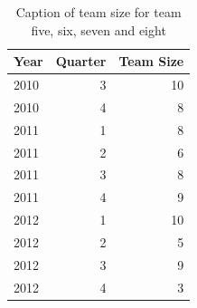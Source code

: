\documentclass[UKenglish]{ifimaster}  %
\begin{document}
\begin{table}[!htbp]
\begin{adjustwidth}{-0cm}{}
{{\begin{tabular}{ | l | r | r | }
\hline
	 Year & Quarter & Team Size \\ \hline
	2010 & 3 & 10  \\ \hline
	2010 & 4 & 8   \\ \hline
	2011 & 1 & 8   \\ \hline
	2011 & 2 & 6   \\ \hline
	2011 & 3 & 8   \\ \hline
	2011 & 4 & 9   \\ \hline
	2012 & 1 & 10   \\ \hline
	2012 & 2 & 5   \\ \hline
	2012 & 3 & 9   \\ \hline
	2012 & 4 & 3   \\ \hline
\end{tabular}
}
}
\end{adjustwidth}
\caption[Optional caption for list of figures]{Caption of team size for team five, six, seven and eight}
\label{Teams:5:8}
\end{table}
\end{document}
